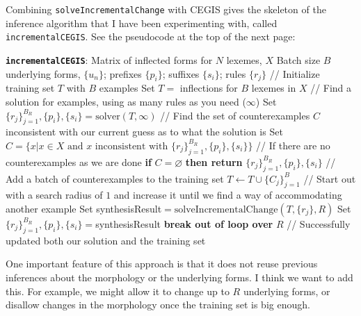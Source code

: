 \documentclass{article}
\begin{document}
Combining \texttt{solveIncrementalChange} with CEGIS gives the
skeleton of the inference algorithm that I have been experimenting
with, called \texttt{incrementalCEGIS}. See the pseudocode at the top of the next page:
\pagebreak
\begin{algorithmic}
  \STATE \textbf{\texttt{incrementalCEGIS}}:
   Matrix of inflected forms for $N$ lexemes, $X$
   Batch size $B$
   underlying forms, $\{u_n\}$; prefixes $\{p_i\}$; suffixes $\{s_i\}$; rules $\{r_j\}$
  \STATE // Initialize training set $T$ with $B$ examples
  \STATE Set $T = $ inflections for $B$ lexemes in $X$
  \STATE // Find a solution for examples, using as many rules as you need ($\infty$)
  \STATE Set $\{r_j\}_{j = 1}^{B_R}, \{p_i\}, \{s_i\} = \text{solver}(T,\infty)$
  \REPEAT
  \STATE // Find the set of counterexamples $C$ inconsistent with our current guess as to what the solution is
  \STATE Set $C = \{x | x\in X \text{ and } x \text{ inconsistent with } \{r_j\}_{j = 1}^{B_R},\{p_i\}, \{s_i\}\}$
  \STATE // If there are no counterexamples as we are done
  \STATE \textbf{if} $C = \varnothing$ \textbf{ then return }$\{r_j\}_{j = 1}^{B_R},\{p_i\}, \{s_i\}$
  \STATE // Add a batch of counterexamples to the training set
  \STATE $T\gets T\cup \{C_j\}_{j = 1}^B$
  \STATE // Start out with a search radius of $1$ and increase it until we find a way of accommodating another example
  \STATE Set synthesisResult$ = \text{solveIncrementalChange}(T,\{r_j\},R)$
  \STATE Set $\{r_j\}_{j = 1}^{B_R}, \{p_i\}, \{s_i\} = $synthesisResult
  \STATE \textbf{break out of loop over }$R$ // Successfully updated both our solution and the training set
\end{algorithmic}
\vspace{1cm} 

One important feature of this approach is that it does not reuse
previous inferences about the morphology or the underlying forms.
I think we want to add this.
For example, we might allow it to change up to $R$ underlying forms,
or disallow changes in the morphology once the training set is big enough.
\end{document}
